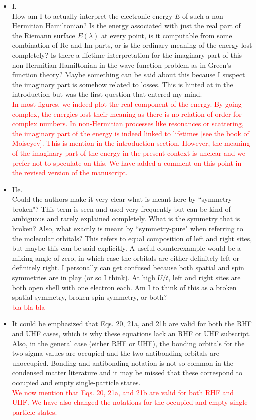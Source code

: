 \documentclass[10pt]{letter}
\newcommand{\alert}[1]{\textcolor{red}{#1}}
\begin{document}
\begin{letter}
\begin{itemize}
\item 
	{I.\\
	How am I to actually interpret the electronic energy $E$ of such a non-Hermitian Hamiltonian? 
	Is the energy associated with just the real part of the Riemann surface $E(\lambda)$ at every point, is it computable from some combination of Re and Im parts, or is the ordinary meaning of the energy lost completely? 
	Is there a lifetime interpretation for the imaginary part of this non-Hermitian Hamiltonian in the wave function problem as in Green's function theory? 
	Maybe something can be said about this because I suspect the imaginary part is somehow related to losses. 
	This is hinted at in the introduction but was the first question that entered my mind.}
	\\
	\alert{In most figures, we indeed plot the real component of the energy.
	By going complex, the energies lost their meaning as there is no relation of order for complex numbers.
	In non-Hermitian processes like resonances or scattering, the imaginary part of the energy is indeed linked to lifetimes [see the book of Moiseyev].
	This is mention in the introduction section.
	However, the meaning  of the imaginary part of the energy in the present context is unclear and we prefer not to speculate on this.
	We have added a comment on this point in the revised version of the manuscript.}

\item 
	{IIe.\\
	Could the authors make it very clear what is meant here by ``symmetry broken"? 
	This term is seen and used very frequently but can be kind of ambiguous and rarely explained completely. 
	What is the symmetry that is broken? 
	Also, what exactly is meant by ``symmetry-pure" when referring to the molecular orbitals? This refers to equal composition of left and right sites, but maybe this can be said explicitly. 
	A useful counterexample would be a mixing angle of zero, in which case the orbitals are either definitely left or definitely right.
	I personally can get confused because both spatial and spin symmetries are in play (or so I think). 
	At high $U/t$, left and right sites are both open shell with one electron each. 
	Am I to think of this as a broken spatial symmetry, broken spin symmetry, or both?}
	\\
	\alert{bla bla bla}

\item 
	{It could be emphasized that Eqs. 20, 21a, and 21b are valid for both the RHF and UHF cases, which is why these equations lack an RHF or UHF subscript. 
	Also, in the general case (either RHF or UHF), the bonding orbitals for the two sigma values are occupied and the two antibonding orbitals are unoccupied. 
	Bonding and antibonding notation is not so common in the condensed matter literature and it may be missed that these correspond to occupied and empty single-particle states.}
	\\
	\alert{We now mention that Eqs. 20, 21a, and 21b are valid for both RHF and UHF.
	We have also changed the notations for the occupied and empty single-particle states.}


\end{itemize}
\end{letter}
\end{document}
